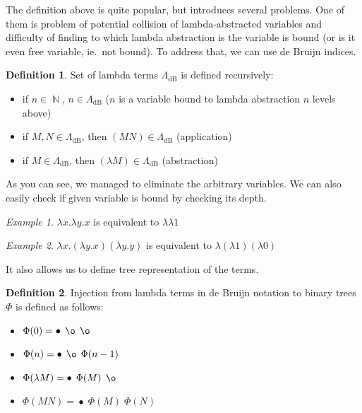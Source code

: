 \documentclass[final]{article}
\theoremstyle{definition}
\newtheorem{definition}{Definition}[subsection]
\theoremstyle{remark}
\newtheorem{example}{Example}[subsection]
\newcommand{\LambdadB}{\ensuremath{\Lambda_{\text{dB}}}}
\DeclareMathOperator{\N}{\mathbb{N}}
\DeclareMathOperator{\n}{\bullet}
\DeclareMathOperator{\no}{\o}
\begin{document}
The definition above is quite popular, but introduces several problems. One of them is problem of potential collision of lambda-abstracted variables and difficulty of finding to which lambda abstraction is the variable is bound (or is it even free variable, ie.\ not bound). To address that, we can use de Bruijn indices.

\begin{definition}
    Set of lambda terms \(\LambdadB\) is defined recursively:
    \begin{itemize}
        \item if \(n \in \N\), \(n \in \LambdadB\) (\(n\) is a variable bound to lambda abstraction \(n\) levels above)
        \item if \(M, N \in \LambdadB\), then \((M N) \in \LambdadB\) (application)
        \item if \(M \in \LambdadB\), then \((\lambda M) \in \LambdadB\) (abstraction)
    \end{itemize}
\end{definition}

As you can see, we managed to eliminate the arbitrary variables. We can also easily check if given variable is bound by checking its depth.

\begin{example}
    \(\lambda x . \lambda y . x\) is equivalent to \(\lambda \lambda 1\)
\end{example}

\begin{example}
    \(\lambda x . (\lambda y . x) (\lambda y . y)\) is equivalent to \(\lambda (\lambda 1) (\lambda 0)\)
\end{example}

It also allows us to define tree representation of the terms.

\begin{definition}
    Injection from lambda terms in de Bruijn notation to binary trees \(\Phi\) is defined as follows:
    \begin{itemize}
        \item \(\Phi(0) = \n\; \no\; \no\)
        \item \(\Phi(n) = \n\; \no\; \Phi(n - 1)\)
        \item \(\Phi(\lambda M) = \n\; \Phi(M)\; \no\)
        \item \(\Phi(M N) = \n\; \Phi(M)\; \Phi(N)\)
    \end{itemize}
\end{definition}
\end{document}
